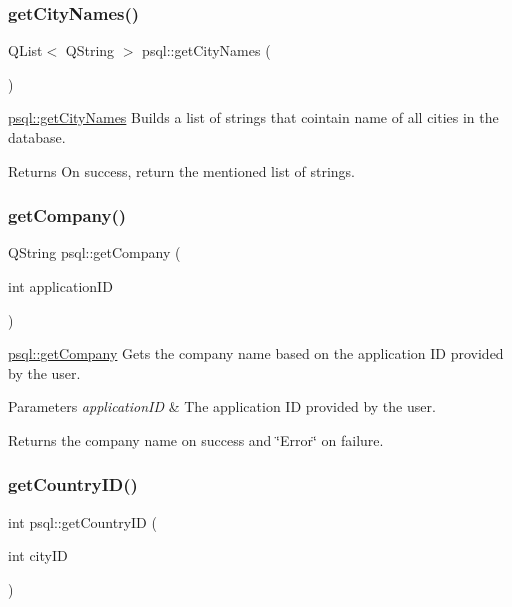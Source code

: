 \subsubsection{\texorpdfstring{get\+City\+Names()}{getCityNames()}}
{\footnotesize\ttfamily Q\+List$<$ Q\+String $>$ psql\+::get\+City\+Names (\begin{DoxyParamCaption}{ }\end{DoxyParamCaption})}



\hyperlink{classpsql_a42ee0cf90055ba6a7a6f564cf04d8bb8}{psql\+::get\+City\+Names} Builds a list of strings that cointain name of all cities in the database. 

\begin{DoxyReturn}{Returns}
On success, return the mentioned list of strings. 
\end{DoxyReturn}
\mbox{\label{classpsql_a09745cd03f09ffb2dacacaab4281915f}} 
\subsubsection{\texorpdfstring{get\+Company()}{getCompany()}}
{\footnotesize\ttfamily Q\+String psql\+::get\+Company (\begin{DoxyParamCaption}\item[{int}]{application\+ID }\end{DoxyParamCaption})}



\hyperlink{classpsql_a09745cd03f09ffb2dacacaab4281915f}{psql\+::get\+Company} Gets the company name based on the application ID provided by the user. 


\begin{DoxyParams}{Parameters}
{\em application\+ID} & The application ID provided by the user. \\
\hline
\end{DoxyParams}
\begin{DoxyReturn}{Returns}
the company name on success and \char`\"{}\+Error\char`\"{} on failure. 
\end{DoxyReturn}
\mbox{\label{classpsql_a81d02dc0350ba11d90257914078ba432}} 
\subsubsection{\texorpdfstring{get\+Country\+I\+D()}{getCountryID()}}
{\footnotesize\ttfamily int psql\+::get\+Country\+ID (\begin{DoxyParamCaption}\item[{int}]{city\+ID }\end{DoxyParamCaption})}



